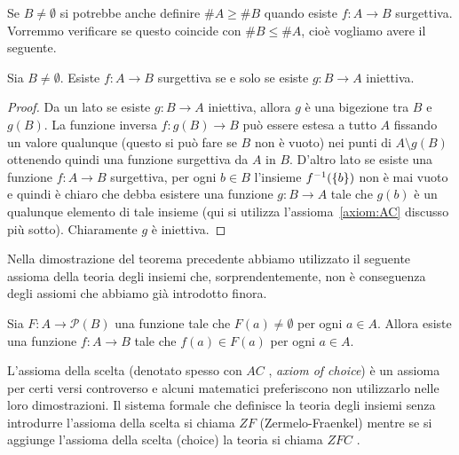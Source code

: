 Se $B\neq \emptyset$ 
si potrebbe anche definire $\#A \ge \#B$ quando esiste $f\colon A \to B$
surgettiva. Vorremmo verificare se questo coincide con $\#B \le \#A$, 
cioè vogliamo avere il seguente.
%
\begin{theorem}\label{th:95444}
  Sia $B\neq \emptyset$.
  Esiste $f\colon A\to B$ surgettiva 
  se e solo se esiste $g\colon B\to A$ iniettiva.
\end{theorem}
% 
\begin{proof}
Da un lato se esiste $g\colon B\to A$ iniettiva, allora $g$ è una bigezione 
tra $B$ e $g(B)$. La funzione inversa $f\colon g(B) \to B$ 
può essere estesa a tutto $A$ fissando un valore qualunque 
(questo si può fare se $B$ non è vuoto) nei punti di $A\setminus g(B)$
ottenendo quindi una funzione surgettiva da $A$ in $B$.
D'altro lato se esiste una funzione $f\colon A\to B$ surgettiva,
per ogni $b\in B$ l'insieme $f^{-1}({\left\{ b \right\}})$ non è mai 
vuoto e quindi è chiaro che debba esistere 
una funzione $g\colon B\to A$ tale che $g(b)$ è un qualunque elemento 
di tale insieme
(qui si utilizza l'assioma~\ref{axiom:AC} discusso più sotto). 
Chiaramente $g$ è iniettiva.
\end{proof}

Nella dimostrazione del teorema precedente abbiamo utilizzato il seguente assioma 
della teoria degli insiemi che, sorprendentemente, non è conseguenza degli assiomi 
che abbiamo già introdotto finora.

\begin{axiom}%
  \label{axiom:AC}%
  Sia $F\colon A \to \mathcal P(B)$
  una funzione tale che $F(a)\neq \emptyset$ 
  per ogni $a\in A$. Allora esiste una funzione
  $f\colon A \to B$ tale che $f(a)\in F(a)$
  per ogni $a\in A$.
\end{axiom}

L'assioma della scelta (denotato spesso con \emph{$AC$}%
%
, \emph{axiom of choice})
è un assioma per certi versi controverso
e alcuni matematici preferiscono non utilizzarlo nelle loro dimostrazioni.
Il sistema formale che definisce la teoria degli insiemi senza 
introdurre l'assioma della scelta 
si chiama \emph{$ZF$}%
%
 (Zermelo-Fraenkel) mentre 
se si aggiunge l'assioma della scelta (choice) la teoria si chiama 
\emph{$ZFC$}%
%
.

